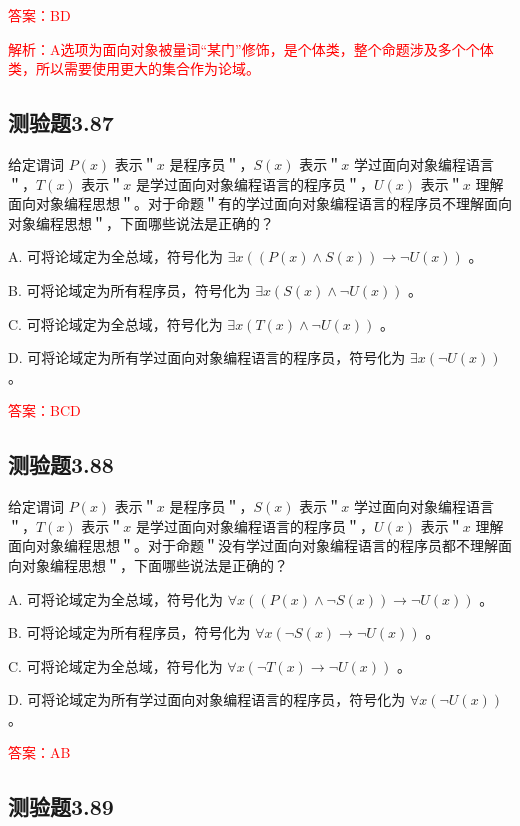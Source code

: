 \documentclass[UTF8, heading=true]{ctexart}
\begin{document}
\textcolor{red}{答案：BD}

\textcolor{red}{解析：A选项为面向对象被量词“某门”修饰，是个体类，整个命题涉及多个个体类，所以需要使用更大的集合作为论域。}

\subsection{测验题3.87}

给定谓词 $P(x)$ 表示＂$x$ 是程序员＂，$S(x)$ 表示＂$x$ 学过面向对象编程语言＂，$T(x)$ 表示＂$x$ 是学过面向对象编程语言的程序员＂，$U(x)$ 表示＂$x$ 理解面向对象编程思想＂。对于命题＂有的学过面向对象编程语言的程序员不理解面向对象编程思想＂，下面哪些说法是正确的？

A. 可将论域定为全总域，符号化为 $\exists x((P(x) \wedge S(x)) \rightarrow \neg U(x))$ 。

B. 可将论域定为所有程序员，符号化为 $\exists x(S(x) \wedge \neg U(x))$ 。

C. 可将论域定为全总域，符号化为 $\exists x(T(x) \wedge \neg U(x))$ 。

D. 可将论域定为所有学过面向对象编程语言的程序员，符号化为 $\exists x(\neg U(x))$ 。


\textcolor{red}{答案：BCD}

\subsection{测验题3.88}

给定谓词 $P(x)$ 表示＂$x$ 是程序员＂，$S(x)$ 表示＂$x$ 学过面向对象编程语言＂，$T(x)$ 表示＂$x$ 是学过面向对象编程语言的程序员＂，$U(x)$ 表示＂$x$ 理解面向对象编程思想＂。对于命题＂没有学过面向对象编程语言的程序员都不理解面向对象编程思想＂，下面哪些说法是正确的？

A. 
可将论域定为全总域，符号化为 $\forall x((P(x) \wedge \neg S(x)) \rightarrow \neg U(x))$ 。

B. 
可将论域定为所有程序员，符号化为 $\forall x(\neg S(x) \rightarrow \neg U(x))$ 。

C. 
可将论域定为全总域，符号化为 $\forall x(\neg T(x) \rightarrow \neg U(x))$ 。

D. 
可将论域定为所有学过面向对象编程语言的程序员，符号化为 $\forall x(\neg U(x))$ 。

\textcolor{red}{答案：AB}

\subsection{测验题3.89}
\end{document}
